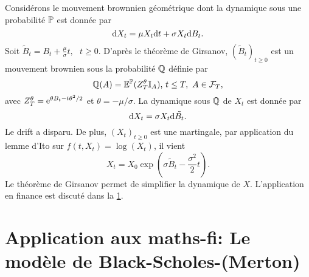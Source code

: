 \begin{ex}
Considérons le mouvement brownnien géométrique dont la dynamique sous une probabilité $\mathbb{P}$ est donnée par 
$$
\text{d} X_t = \mu X_t\text{d} t+\sigma X_t\text{d} B_t.
$$
Soit $\tilde{B}_t = B_t + \frac{\mu}{\sigma}t,\text{ }t\geq 0$. D'après le théorème de Girsanov, $(\tilde{B}_t)_{t\geq 0}$ est un mouvement brownien sous la probabilité $\mathbb{Q}$ définie par 
$$
\mathbb{Q}(A) = \mathbb{E}^{\mathbb{P}}(Z_T^\theta\mathbb{I}_A)\text{, }t\leq T,\text{ }A\in \mathcal{F}_T,
$$
avec $Z_T^\theta = \mathrm{e}^{\theta B_t - t\theta^2/2}$ et $\theta = -\mu / \sigma$. La dynamique sous $\mathbb{Q}$ de $X_t$ est donnée par 
$$
\text{d} X_t = \sigma X_t\text{d} \tilde{B_t}.
$$
Le drift a disparu. De plus,  $(X_t)_{t\geq 0}$ est une martingale, par application du lemme d'Ito sur $f(t, X_t) = \log(X_t)$, il vient 
$$
X_t = X_0\exp\left(\sigma \tilde{B}_t - \frac{\sigma^2}{2}t\right).
$$
Le théorème de Girsanov permet de simplifier la dynamique de $X$. L'application en finance est discuté dans la \cref{sec:BS}.
\end{ex}
\section{Application aux maths-fi: Le modèle de Black-Scholes-(Merton)}\label{sec:BS}
